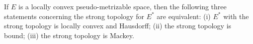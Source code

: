 If $E$ is a locally convex pseudo-metrizable space, then the following three statements concerning the strong topology for $E^{*}$ are equivalent: (i) $E^{*}$ with the strong topology is locally convex and Hausdorff; (ii) the strong topology is bound; (iii) the strong topology is Mackey.
